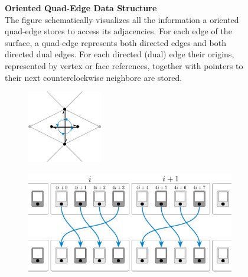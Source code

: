 \documentclass{stdlocal}
\begin{document}
\begin{figure}[H]
\begin{subfigure}[b]{0.4\linewidth}
  \end{subfigure}
  \caption[Oriented Quad-Edge Data Structure]{
    \textbf{Oriented Quad-Edge Data Structure}\\
    The figure schematically visualizes all the information a oriented quad-edge stores to access its adjacencies.
    For each edge of the surface, a quad-edge represents both directed edges and both directed dual edges.
    For each directed (dual) edge their origins, represented by vertex or face references, together with pointers to their next counterclockwise neighbore are stored.
  }
  \label{fig:quad-edge}
\end{figure}

\begin{figure}[H]
  \centering
  \begin{subfigure}[b]{0.31\linewidth}
    \centering
    \includegraphics[width=\linewidth]{figures/quad-edge-rot.pdf}
  \end{subfigure}
  \hfill
  \begin{subfigure}[b]{0.67\linewidth}
    \centering
    \includegraphics[width=\linewidth]{figures/quad-edge-struct-rot.pdf}

\end{subfigure}
\end{figure}
\end{document}
